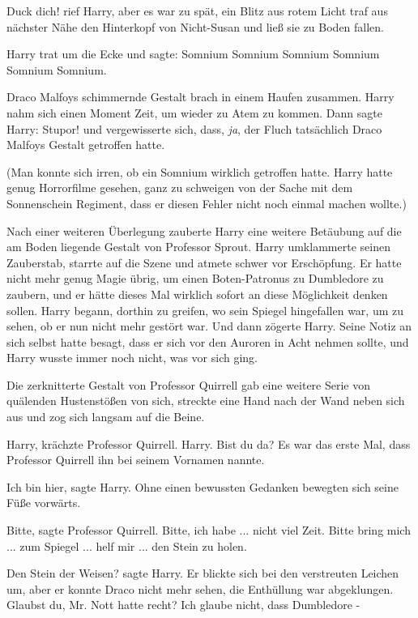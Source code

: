 \glqq{}Duck dich!\grqq{} rief Harry, aber es war zu spät, ein Blitz aus rotem
Licht traf aus nächster Nähe den Hinterkopf von Nicht-Susan und ließ sie zu
Boden fallen.

Harry trat um die Ecke und sagte: \glqq{}Somnium Somnium Somnium Somnium Somnium
Somnium.\grqq{}

Draco Malfoys schimmernde Gestalt brach in einem Haufen zusammen. Harry nahm
sich einen Moment Zeit, um wieder zu Atem zu kommen. Dann sagte Harry: \glqq{}
Stupor!\grqq{} und vergewisserte sich, dass, \emph{ja}, der Fluch tatsächlich
Draco Malfoys Gestalt getroffen hatte.

(Man konnte sich irren, ob ein Somnium wirklich getroffen hatte. Harry hatte
genug Horrorfilme gesehen, ganz zu schweigen von der Sache mit dem Sonnenschein
Regiment, dass er diesen Fehler nicht noch einmal machen wollte.)

Nach einer weiteren Überlegung zauberte Harry eine weitere Betäubung auf die am
Boden liegende Gestalt von Professor Sprout. Harry umklammerte seinen
Zauberstab, starrte auf die Szene und atmete schwer vor Erschöpfung. Er hatte
nicht mehr genug Magie übrig, um einen Boten-Patronus zu Dumbledore zu zaubern,
und er hätte dieses Mal wirklich sofort an diese Möglichkeit denken sollen.
Harry begann, dorthin zu greifen, wo sein Spiegel hingefallen war, um zu sehen,
ob er nun nicht mehr gestört war. Und dann zögerte Harry. Seine Notiz an sich
selbst hatte besagt, dass er sich vor den Auroren in Acht nehmen sollte, und
Harry wusste immer noch nicht, was vor sich ging.

Die zerknitterte Gestalt von Professor Quirrell gab eine weitere Serie von
quälenden Hustenstößen von sich, streckte eine Hand nach der Wand neben sich aus
und zog sich langsam auf die Beine.

\glqq{}Harry\grqq{}, krächzte Professor Quirrell. \glqq{}Harry. Bist du da?\grqq{} Es
war das erste Mal, dass Professor Quirrell ihn bei seinem Vornamen nannte.

\glqq{}Ich bin hier\grqq{}, sagte Harry. Ohne einen bewussten Gedanken bewegten
sich seine Füße vorwärts.

\glqq{}Bitte\grqq{}, sagte Professor Quirrell. \glqq{}Bitte, ich habe ... nicht
viel Zeit. Bitte bring mich ... zum Spiegel ... helf mir ... den Stein zu
holen.\grqq{}

\glqq{}Den Stein der Weisen?\grqq{} sagte Harry. Er blickte sich bei den
verstreuten Leichen um, aber er konnte Draco nicht mehr sehen, die Enthüllung
war abgeklungen. \glqq{}Glaubst du, Mr. Nott hatte recht? Ich glaube nicht, dass
Dumbledore -\grqq{}

